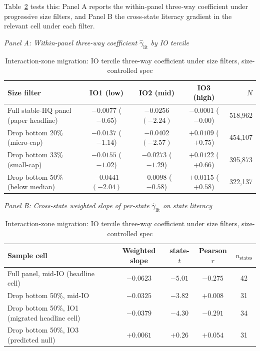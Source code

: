 Table~\ref{tab:migration} tests this: Panel A reports the within-panel three-way coefficient under progressive size filters, and Panel B the cross-state literacy gradient in the relevant cell under each filter.

\begin{table}[t]
\centering
\caption{Interaction-zone migration: IO tercile three-way coefficient under size filters, size-controlled spec}
\label{tab:migration}
\footnotesize
\begin{minipage}{\textwidth}
\centering
\textit{Panel A: Within-panel three-way coefficient $\hat\gamma_{\text{lit}}$ by IO tercile}\\[2pt]
\begin{tabular}{lcccr}
\toprule
Size filter & IO1 (low) & IO2 (mid) & IO3 (high) & $N$ \\
\midrule
Full stable-HQ panel (paper headline)
  & $-0.0077$ ($-0.65$)
  & $\mathbf{-0.0256}$ $(\mathbf{-2.24})$
  & $-0.0001$ ($-0.00$)
  & 518,962 \\
Drop bottom 20\% (micro-cap)
  & $-0.0137$ ($-1.14$)
  & $\mathbf{-0.0402}$ $(\mathbf{-2.57})$
  & $+0.0109$ ($+0.75$)
  & 454,107 \\
Drop bottom 33\% (small-cap)
  & $-0.0155$ ($-1.02$)
  & $-0.0273$ ($-1.29$)
  & $+0.0122$ ($+0.66$)
  & 395,873 \\
Drop bottom 50\% (below median)
  & $\mathbf{-0.0441}$ $(\mathbf{-2.04})$
  & $-0.0098$ ($-0.58$)
  & $+0.0115$ ($+0.58$)
  & 322,137 \\
\bottomrule
\end{tabular}

\medskip
\textit{Panel B: Cross-state weighted slope of per-state $\hat\gamma_{\text{lit}}$ on state literacy}\\[2pt]
\begin{tabular}{lcccc}
\toprule
Sample cell & Weighted slope & state-$t$ & Pearson $r$ & $n_{\text{states}}$ \\
\midrule
Full panel, mid-IO (headline cell)
  & $\mathbf{-0.0623}$ & $\mathbf{-5.01}$ & $-0.275$ & 42 \\
Drop bottom 50\%, mid-IO
  & $-0.0325$ & $-3.82$ & $+0.008$ & 31 \\
Drop bottom 50\%, IO1 (migrated headline cell)
  & $\mathbf{-0.0379}$ & $\mathbf{-4.30}$ & $\mathbf{-0.291}$ & 34 \\
Drop bottom 50\%, IO3 (predicted null)
  & $+0.0061$ & $+0.26$ & $+0.054$ & 31 \\
\bottomrule
\end{tabular}
\end{minipage}


\end{table}
